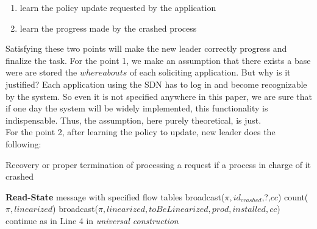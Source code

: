 \documentclass{article}
\theoremstyle{remark}
\begin{document}
\begin{enumerate}
\item learn the policy update requested by the application
\item learn the progress made by the crashed process 
\end{enumerate}
Satisfying these two points will make the new leader correctly progress and finalize the task.
For the point 1, we make an assumption that there exists a base were are stored the $whereabouts$ of each soliciting application. But why is it justified? Each application using the SDN has to log in and become recognizable by the system. So even it is not specified anywhere in this paper, we are sure that if one day the system will be widely implemented, this functionality is indispensable. Thus, the assumption, here purely theoretical, is just.\\
For the point 2, after learning the policy to update, new leader does the following:\\
\begin{algorithm}
\caption{Recovery or proper termination of processing a request if a process in charge of it crashed}
\begin{algorithmic}[1]
	\State \textbf{Read-State} message with specified flow tables
\EndFor
\State broadcast($\pi , id_{crashed}$,?,$cc$)
	\State count($\pi,linearized$)
	\EndIf
{} { broadcast($\pi,linearized,toBeLinearized,prod,installed,cc$)}
\EndIf 
\State continue as in Line 4 in \emph{universal construction}
\end{algorithmic}
\end{algorithm}
\end{document}
